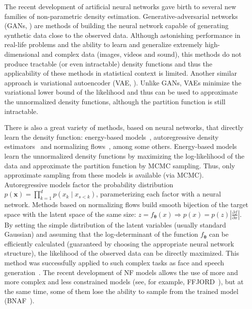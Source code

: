 \documentclass[accepted]{uai2021}
\renewcommand\vec{\boldsymbol}
\begin{document}
  The recent development of artificial neural networks gave birth to several new families of non-parametric density estimation. Generative-adversarial networks (GANs, \cite{goodfellow2014generative}) are methods of building the neural network capable of generating synthetic data close to the observed data. Although astonishing performance in real-life problems and the ability to learn and generalize extremely high-dimensional and complex data (images, videos and sound), this methods do not produce tractable (or even intractable) density functions and thus the applicability of these methods in statistical context is limited. Another similar approach is variational autoencoder (VAE, \cite{Kingma2013}). Unlike GANs, VAEs minimize the variational lower bound of the likelihood and thus can be used to approximate the unnormalized density functions, although the partition function is still intractable.

  There is also a great variety of methods, based on neural networks, that directly learn the density function: energy-based models~\citep{LeCun2006}, autoregressive density estimators~\cite{Ryder2018} and normalizing flows~\cite{Kobyzev2020}, among some others. Energy-based models learn the unnormalized density functions by maximizing the log-likelihood of the data and approximate the partition function by MCMC sampling. Thus, only approximate sampling from these models is available (via MCMC). Autoregressive models factor the probability distribution $p(\vec{x}) = \prod_{k=1}^{d} p(x_k \mid x_{s < k})$, parameterizing each factor with a neural network. Methods based on normalizing flows build smooth bijection of the target space with the latent space of the same size: $z = f_{\vec{\theta}}(x) \Rightarrow p(x) = p(z) \left| \frac{\partial f}{\partial x} \right|$. By setting the simple distribution of the latent variables (usually standard Gaussian) and assuming that the log-determinant of the function $f_{\vec{\theta}}$ can be efficiently calculated (guaranteed by choosing the appropriate neural network structure), the likelihood of the observed data can be directly maximized. This method was successfully applied to such complex tasks as face and speech generation~\citep{Kingma2018,Kim2020}. The recent development of NF models allows the use of more and more complex and less constrained models (see, for example, FFJORD~\citep{Grathwohl2018}), but at the same time, some of them lose the ability to sample from the trained model (BNAF~\citep{DeCao2019}).
\end{document}
